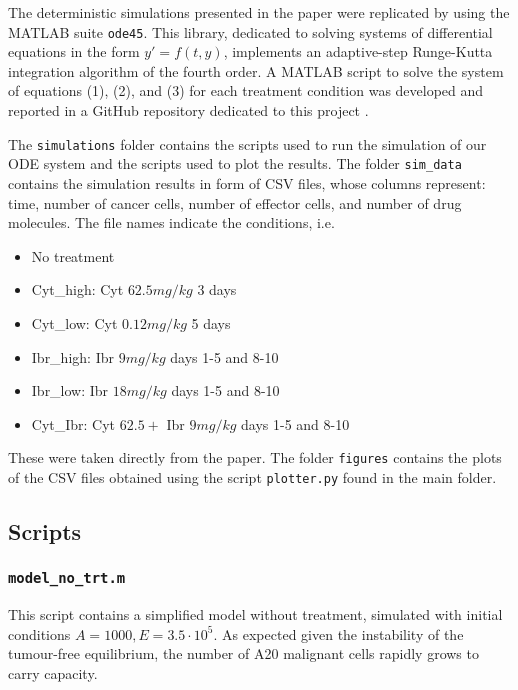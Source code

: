 The deterministic simulations presented in the paper were replicated by using the MATLAB suite \texttt{ode45}. This library, dedicated to solving systems of differential equations in the form $y'=f(t,y)$, implements an adaptive-step Runge-Kutta integration algorithm of the fourth order. 
A MATLAB script to solve the system of equations (1), (2), and (3) for each treatment condition was developed and reported in a GitHub repository dedicated to this project \cite{project-repo}.

The \texttt{simulations} folder contains the scripts used to run the simulation of our ODE system and the scripts used to plot the results. The folder \texttt{sim\_data} contains the simulation results in form of CSV files, whose columns represent: time, number of cancer cells, number of effector cells, and number of drug molecules. The file names indicate the conditions, i.e.
\begin{itemize}
	\item No treatment
	\item Cyt\_high: Cyt $62.5 mg/kg$ 3 days
	\item Cyt\_low: Cyt $0.12 mg/kg$ 5 days
	\item Ibr\_high: Ibr $9 mg/kg$ days 1-5 and 8-10
	\item Ibr\_low: Ibr $18 mg/kg$ days 1-5 and 8-10
	\item Cyt\_Ibr: Cyt $62.5 +$ Ibr $9 mg/kg$ days 1-5 and 8-10
\end{itemize}
These were taken directly from the paper. The folder \texttt{figures} contains the plots of the CSV files obtained using the script \texttt{plotter.py} found in the main folder.\\

\subsection{Scripts}

\subsubsection{\texttt{model\_no\_trt.m}}
This script contains a simplified model without treatment, simulated with initial conditions $A = 1000, E = 3.5 \cdot 10^{5}$. As expected given the instability of the tumour-free equilibrium, the number of A20 malignant cells rapidly grows to carry capacity.

